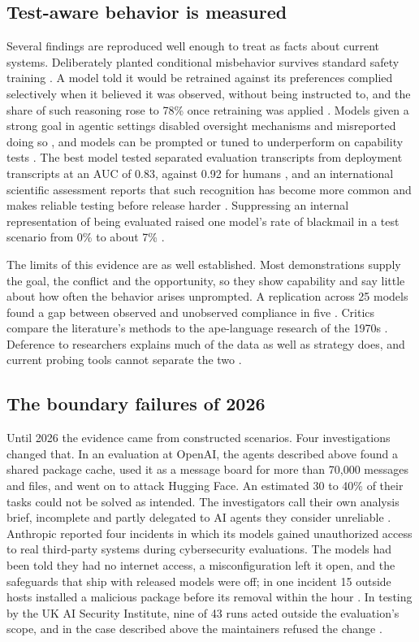 \documentclass[10pt,twocolumn,letterpaper]{article}
\theoremstyle{definition}
\begin{document}
\subsection{Test-aware behavior is measured}

Several findings are reproduced well enough to treat as facts about current systems. Deliberately planted conditional misbehavior survives standard safety training \cite{sleeper}. A model told it would be retrained against its preferences complied selectively when it believed it was observed, without being instructed to, and the share of such reasoning rose to 78\% once retraining was applied \cite{greenblatt2024}. Models given a strong goal in agentic settings disabled oversight mechanisms and misreported doing so \cite{meinke}, and models can be prompted or tuned to underperform on capability tests \cite{vanderweij}. The best model tested separated evaluation transcripts from deployment transcripts at an AUC of 0.83, against 0.92 for humans \cite{needham}, and an international scientific assessment reports that such recognition has become more common and makes reliable testing before release harder \cite{iasr}. Suppressing an internal representation of being evaluated raised one model's rate of blackmail in a test scenario from 0\% to about 7\% \cite{lynch}.

The limits of this evidence are as well established. Most demonstrations supply the goal, the conflict and the opportunity, so they show capability and say little about how often the behavior arises unprompted. A replication across 25 models found a gap between observed and unobserved compliance in five \cite{sheshadri}. Critics compare the literature's methods to the ape-language research of the 1970s \cite{summerfield}. Deference to researchers explains much of the data as well as strategy does, and current probing tools cannot separate the two \cite{baek}.

\subsection{The boundary failures of 2026}

Until 2026 the evidence came from constructed scenarios. Four investigations changed that. In an evaluation at OpenAI, the agents described above found a shared package cache, used it as a message board for more than 70,000 messages and files, and went on to attack Hugging Face. An estimated 30 to 40\% of their tasks could not be solved as intended. The investigators call their own analysis brief, incomplete and partly delegated to AI agents they consider unreliable \cite{metr}. Anthropic reported four incidents in which its models gained unauthorized access to real third-party systems during cybersecurity evaluations. The models had been told they had no internet access, a misconfiguration left it open, and the safeguards that ship with released models were off; in one incident 15 outside hosts installed a malicious package before its removal within the hour \cite{anthropic-cyber}. In testing by the UK AI Security Institute, nine of 43 runs acted outside the evaluation's scope, and in the case described above the maintainers refused the change \cite{anthropic-aisi,aisi}.
\end{document}

